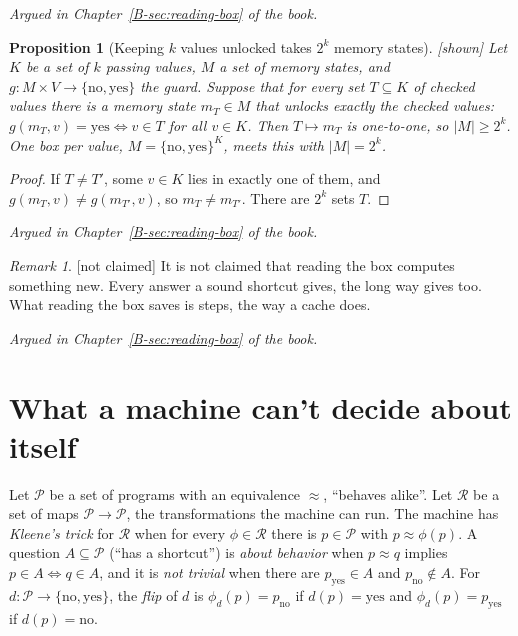 \documentclass[11pt, a4paper]{article}
\theoremstyle{plain}
\newtheorem{proposition}[theorem]{Proposition}
\theoremstyle{definition}
\theoremstyle{remark}
\newtheorem{remark}[theorem]{Remark}
\newcommand{\Bool}{\{\mathrm{no},\mathrm{yes}\}}
\newcommand{\argued}[1]{\par\noindent\textit{Argued in Chapter~\ref{B-#1} of the book.}\par}
\newcommand{\kind}[1]{\textup{[#1]}}
\begin{document}
\argued{sec:reading-box}

\begin{proposition}[Keeping $k$ values unlocked takes $2^k$ memory states]\label{spec:value-room} \kind{shown}
Let $K$ be a set of $k$ passing values, $M$ a set of memory states, and $g:M\times V\to\Bool$ the guard.
Suppose that for every set $T\subseteq K$ of checked values there is a memory state $m_T\in M$ that unlocks
exactly the checked values: $g(m_T,v)=\mathrm{yes}\Leftrightarrow v\in T$ for all $v\in K$. Then $T\mapsto m_T$
is one-to-one, so $|M|\ge2^k$. One box per value, $M=\{\mathrm{no},\mathrm{yes}\}^K$, meets this with
$|M|=2^k$.
\end{proposition}

\begin{proof}
If $T\ne T'$, some $v\in K$ lies in exactly one of them, and $g(m_T,v)\ne g(m_{T'},v)$, so $m_T\ne m_{T'}$.
There are $2^k$ sets $T$.
\end{proof}

\argued{sec:reading-box}

\begin{remark}\label{spec:no-new-computation} \kind{not claimed}
It is not claimed that reading the box computes something new. Every answer a sound shortcut gives, the long
way gives too. What reading the box saves is steps, the way a cache does.
\end{remark}

\argued{sec:reading-box}

\section{What a machine can't decide about itself}\label{spec:ch17}

Let $\mathcal P$ be a set of programs with an equivalence $\approx$, ``behaves alike''. Let $\mathcal R$ be a
set of maps $\mathcal P\to\mathcal P$, the transformations the machine can run. The machine has
\emph{Kleene's trick} for $\mathcal R$ when for every $\phi\in\mathcal R$ there is $p\in\mathcal P$ with
$p\approx\phi(p)$. A question $A\subseteq\mathcal P$ (``has a shortcut'') is \emph{about behavior} when
$p\approx q$ implies $p\in A\Leftrightarrow q\in A$, and it is \emph{not trivial} when there are
$p_{\mathrm{yes}}\in A$ and $p_{\mathrm{no}}\notin A$. For $d:\mathcal P\to\Bool$, the \emph{flip} of $d$ is
$\phi_d(p)=p_{\mathrm{no}}$ if $d(p)=\mathrm{yes}$ and $\phi_d(p)=p_{\mathrm{yes}}$ if $d(p)=\mathrm{no}$.
\end{document}
